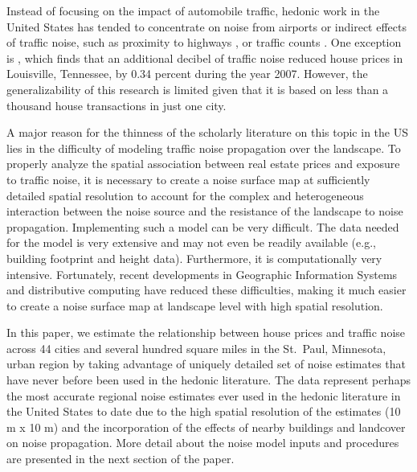 \documentclass{article}\usepackage{graphicx, color}
\begin{document}
Instead of focusing on the impact of automobile traffic, hedonic work in the United States has tended to concentrate on noise from airports \citep{Espey2000, McMillen2004, Cohen2008a} or indirect effects of traffic noise, such as proximity to highways \citep{Matthews2007, Chernobai2009, Li2012}, or traffic counts \citep{HughesJr.1992, Larsen2012}. One exception is \citet{Cheng2008}, which finds that an additional decibel of traffic noise reduced house prices in Louisville, Tennessee, by 0.34 percent during the year 2007. However, the generalizability of this research is limited given that it is based on less than a thousand house transactions in just one city. 

A major reason for the thinness of the scholarly literature on this topic in the US lies in the difficulty of modeling traffic noise propagation over the landscape. To properly analyze the spatial association between real estate prices and exposure to traffic noise, it is necessary to create a noise surface map at sufficiently detailed spatial resolution to account for the complex and heterogeneous interaction between the noise source and the resistance of the landscape to noise propagation.  Implementing such a model can be very difficult.  The data needed for the model is very extensive and may not even be readily available (e.g., building footprint and height data).  Furthermore, it is computationally very intensive. Fortunately, recent developments in Geographic Information Systems and distributive computing have reduced these difficulties, making it much easier to create a noise surface map at landscape level with high spatial resolution.  

In this paper, we estimate the relationship between house prices and traffic noise across 44 cities and several hundred square miles in the St.\ Paul, Minnesota, urban region by taking advantage of uniquely detailed set of noise estimates that have never before been used in the hedonic literature. The data represent perhaps the most accurate regional noise estimates ever used in the hedonic literature in the United States to date due to the high spatial resolution of the estimates (10 m x 10 m) and the incorporation of the effects of nearby buildings and landcover on noise propagation. More detail about the noise model inputs and procedures are presented in the next section of the paper. 
 
\end{document}
